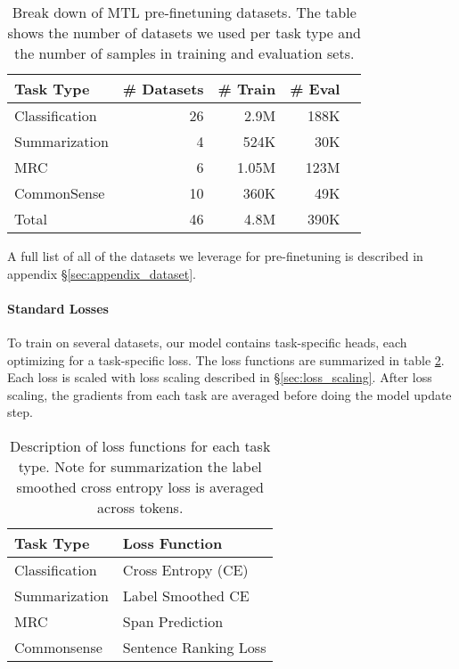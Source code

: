 \documentclass[11pt,a4paper]{article}
\begin{document}
\begin{table}[]
\centering
\small
\begin{tabular}{@{}lrrrr@{}}
\toprule
Task Type                     & \# Datasets & \# Train & \# Eval  \\  
\midrule
Classification                &    26         &    2.9M      &        188K         \\
Summarization                &   4          &      524K     &           30K      \\
MRC &   6           &     1.05M     &    123M            \\
CommonSense         &         10    &          360K & 49K\\   \midrule 
Total                &  46           &    4.8M    &  390K \\ 
\bottomrule
\end{tabular}
\caption{Break down of MTL pre-finetuning datasets. The table shows the number of datasets we used per task type and the number of samples in training and evaluation sets.}
\label{tab:mtl_datasets}
\end{table}

A full list of all of the datasets we leverage for pre-finetuning is described in appendix \S \ref{sec:appendix_dataset}. 


\paragraph{Standard Losses} 
To train on several datasets, our model contains task-specific heads, each optimizing for a task-specific loss. The loss functions are summarized in table \ref{tab:mtl_loss}. Each loss is scaled with loss scaling described in \S \ref{sec:loss_scaling}. After loss scaling, the gradients from each task are averaged before doing the model update step.

\begin{table}[]
\centering
\small
\begin{tabular}{@{}ll@{}}
\toprule
Task Type                      & Loss Function  \\  \midrule
Classification                &    Cross Entropy (CE)              \\
Summarization                 &   Label Smoothed CE \cite{inception_label_smoothing}                \\
MRC &     Span Prediction \cite{bidaf}        \\
Commonsense         &  Sentence Ranking Loss  \cite{ROBERTA}         \\
\bottomrule
\end{tabular}
\caption{Description of loss functions for each task type. Note for summarization the label smoothed cross entropy loss is averaged across tokens.}
\label{tab:mtl_loss}
\end{table}
\end{document}
